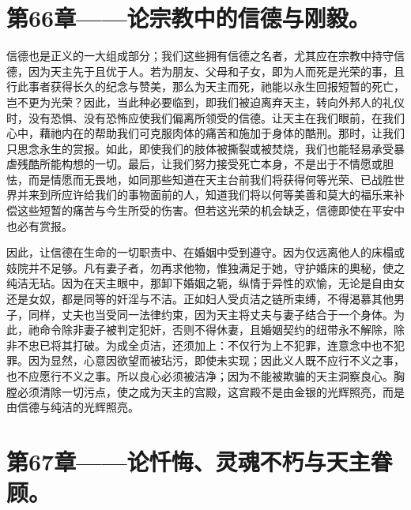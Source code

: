 
\section{第66章——论宗教中的信德与刚毅。}

信德也是正义的一大组成部分；我们这些拥有信德之名者，尤其应在宗教中持守信德，因为天主先于且优于人。若为朋友、父母和子女，即为人而死是光荣的事，且行此事者获得长久的纪念与赞美，那么为天主而死，祂能以永生回报短暂的死亡，岂不更为光荣？因此，当此种必要临到，即我们被迫离弃天主，转向外邦人的礼仪时，没有恐惧、没有恐怖应使我们偏离所领受的信德。让天主在我们眼前，在我们心中，藉祂内在的帮助我们可克服肉体的痛苦和施加于身体的酷刑。那时，让我们只思念永生的赏报。如此，即使我们的肢体被撕裂或被焚烧，我们也能轻易承受暴虐残酷所能构想的一切。最后，让我们努力接受死亡本身，不是出于不情愿或胆怯，而是情愿而无畏地，如同那些知道在天主台前我们将获得何等光荣、已战胜世界并来到所应许给我们的事物面前的人，知道我们将以何等美善和莫大的福乐来补偿这些短暂的痛苦与今生所受的伤害。但若这光荣的机会缺乏，信德即使在平安中也必有赏报。\par

因此，让信德在生命的一切职责中、在婚姻中受到遵守。因为仅远离他人的床榻或妓院并不足够。凡有妻子者，勿再求他物，惟独满足于她，守护婚床的奧秘，使之纯洁无玷。因为在天主眼中，那卸下婚姻之轭，纵情于异性的欢愉，无论是自由女还是女奴，都是同等的奸淫与不洁。正如妇人受贞洁之链所束缚，不得渴慕其他男子，同样，丈夫也当受同一法律约束，因为天主将丈夫与妻子结合于一个身体。为此，祂命令除非妻子被判定犯奸，否则不得休妻，且婚姻契约的纽带永不解除，除非不忠已将其打破。为成全贞洁，还须加上：不仅行为上不犯罪，连意念中也不犯罪。因为显然，心意因欲望而被玷污，即使未实现；因此义人既不应行不义之事，也不应愿行不义之事。所以良心必须被洁净；因为不能被欺骗的天主洞察良心。胸膛必须清除一切污点，使之成为天主的宫殿，这宫殿不是由金银的光辉照亮，而是由信德与纯洁的光辉照亮。\par


\section{第67章——论忏悔、灵魂不朽与天主眷顾。}

